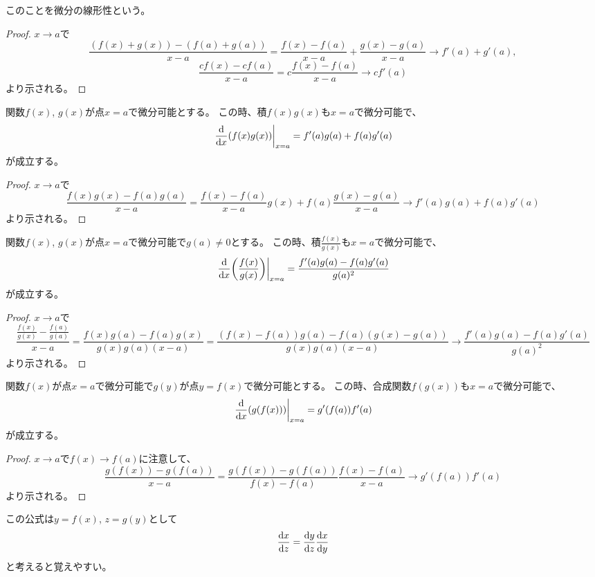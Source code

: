 このことを微分の線形性という。

\begin{proof}
$x \to a$で
$$
\frac{(f(x)+g(x))-(f(a)+g(a))}{x-a}
= \frac{f(x)-f(a)}{x-a}+\frac{g(x)-g(a)}{x-a}
\to f'(a)+g'(a),
$$
$$
\frac{c f(x)-c f(a)}{x-a}
= c\frac{f(x)-f(a)}{x-a}
\to c f'(a)
$$
より示される。
\end{proof}

\begin{proposition}[積の微分]
関数$f(x)$, $g(x)$が点$x = a$で微分可能とする。
この時、積$f(x)g(x)$も$x = a$で微分可能で、
$$
\eval{\dv{x}(f(x)g(x))}_{x = a} = f'(a)g(a)+f(a)g'(a)
$$
が成立する。
\end{proposition}

\begin{proof}
$x \to a$で
$$
\frac{f(x)g(x)-f(a)g(a)}{x-a}
= \frac{f(x)-f(a)}{x-a}g(x)+f(a)\frac{g(x)-g(a)}{x-a}
\to f'(a)g(a)+f(a)g'(a)
$$
より示される。
\end{proof}

\begin{proposition}[商の微分]
関数$f(x)$, $g(x)$が点$x = a$で微分可能で$g(a) \ne 0$とする。
この時、積$\frac{f(x)}{g(x)}$も$x = a$で微分可能で、
$$
\eval{\dv{x}(\frac{f(x)}{g(x)})}_{x = a} = \frac{f'(a)g(a)-f(a)g'(a)}{g(a)^2}
$$
が成立する。
\end{proposition}

\begin{proof}
$x \to a$で
$$
\frac{\frac{f(x)}{g(x)}-\frac{f(a)}{g(a)}}{x-a}
= \frac{f(x)g(a)-f(a)g(x)}{g(x)g(a)(x-a)}
= \frac{(f(x)-f(a))g(a)-f(a)(g(x)-g(a))}{g(x)g(a)(x-a)}
\to \frac{f'(a)g(a)-f(a)g'(a)}{g(a)^2}
$$
より示される。
\end{proof}

\begin{proposition}[合成関数の微分]
関数$f(x)$が点$x = a$で微分可能で$g(y)$が点$y = f(x)$で微分可能とする。
この時、合成関数$f(g(x))$も$x = a$で微分可能で、
$$
\eval{\dv{x}(g(f(x)))}_{x = a} = g'(f(a))f'(a)
$$
が成立する。
\end{proposition}

\begin{proof}
$x \to a$で$f(x) \to f(a)$に注意して、
$$
\frac{g(f(x))-g(f(a))}{x-a}
= \frac{g(f(x))-g(f(a))}{f(x)-f(a)}\frac{f(x)-f(a)}{x-a}
\to g'(f(a))f'(a)
$$
より示される。
\end{proof}

この公式は$y = f(x)$, $z = g(y)$として
$$
\dv{x}{z} = \dv{y}{z}\dv{x}{y}
$$
と考えると覚えやすい。

